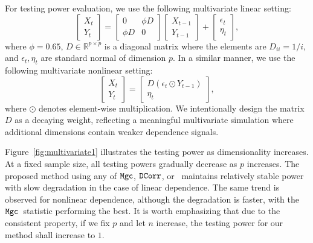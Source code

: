 For testing power evaluation, we use the following multivariate linear setting:
\begin{equation*}
    \begin{bmatrix}
    X_t\\
    Y_t
    \end{bmatrix}
    =
    \begin{bmatrix}
    0 & \phi D\\
    \phi D & 0
    \end{bmatrix}
    \begin{bmatrix}
    X_{t-1}\\
    Y_{t-1}
    \end{bmatrix}
    +
    \begin{bmatrix}
    \epsilon_t\\
    \eta_t
    \end{bmatrix},
\end{equation*}
where $\phi = 0.65$, $D\in \mathbb{R}^{p\times p}$ is a diagonal matrix where the elements are $D_{ii} = 1 / i$, and $\epsilon_t, \eta_t$ are standard normal of dimension $p$. In a similar manner, we use the following multivariate nonlinear setting:
\begin{equation*}
    \begin{bmatrix}
    X_t\\
    Y_t
    \end{bmatrix}
    =
    \begin{bmatrix}
    D (\epsilon_t \odot Y_{t-1})\\ 
    \eta_t
    \end{bmatrix},
\end{equation*}
where $\odot$ denotes element-wise multiplication. We intentionally design the matrix $D$ as a decaying weight, reflecting a meaningful multivariate simulation where additional dimensions contain weaker dependence signals.

Figure~\ref{fig:multivariate1} illustrates the testing power as dimensionality increases. At a fixed sample size, all testing powers gradually decrease as $p$ increases. The proposed method using any of $\mathtt{Mgc}$, $\operatorname{\mathtt{DCorr}}$, or \hsic~maintains relatively stable power with slow degradation in the case of linear dependence. The same trend is observed for nonlinear dependence, although the degradation is faster, with the $\mathtt{Mgc}$~statistic performing the best. It is worth emphasizing that due to the consistent property, if we fix $p$ and let $n$ increase, the testing power for our method shall increase to $1$. 

